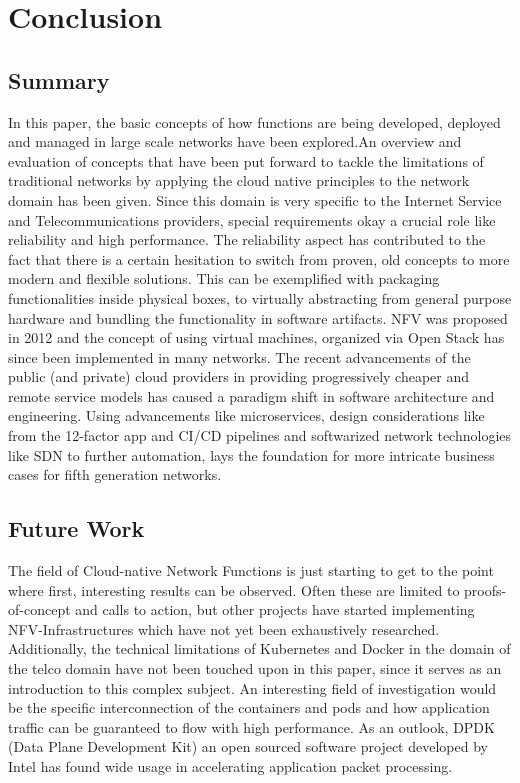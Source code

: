 \section{Conclusion}

\subsection{Summary}
In this paper, the basic concepts of how functions are being developed, deployed and managed in large scale networks have been explored.An overview and evaluation of concepts that have been put forward to tackle the limitations of traditional networks by applying the cloud native principles to the network domain has been given.
Since this domain is very specific to the Internet Service and Telecommunications providers, special requirements okay a crucial role like reliability and high performance. The reliability aspect has contributed to the fact that there is a certain hesitation to switch from proven, old concepts to more modern and flexible solutions. This can be exemplified with packaging functionalities inside physical boxes, to virtually abstracting from general purpose hardware and bundling the functionality in software artifacts. NFV was proposed in 2012 and the concept of using virtual machines, organized via Open Stack has since been implemented in many networks. The recent advancements of the public (and private) cloud providers in providing progressively cheaper and remote service models has caused a paradigm shift in software architecture and engineering. Using advancements like microservices, design considerations like from the 12-factor app and CI/CD pipelines and softwarized network technologies like SDN to further automation, lays the foundation for more intricate business cases for fifth generation networks.

\subsection{Future Work}
The field of Cloud-native Network Functions is just starting to get to the point where first, interesting results can be observed. Often these are limited to proofs-of-concept and calls to action, but other projects have started implementing NFV-Infrastructures which have not yet been exhaustively researched. Additionally, the technical limitations of Kubernetes and Docker in the domain of the telco domain have not been touched upon in this paper, since it serves as an introduction to this complex subject. An interesting field of investigation would be the specific interconnection of the containers and pods and how application traffic can be guaranteed to flow with high performance. As an outlook, DPDK (Data Plane Development Kit) an open sourced software project developed by Intel has found wide usage in accelerating application packet processing. 